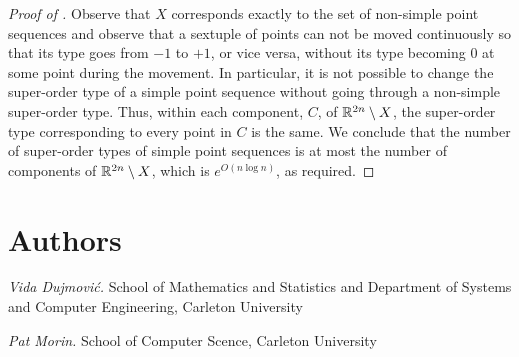 \documentclass{patmorin}
\begin{document}
\begin{proof}[Proof of ]
   Observe that $X$ corresponds exactly to the set of non-simple
   point sequences and observe that a sextuple of points can not be moved
   continuously so that its type goes from $-1$ to $+1$, or vice versa,
   without its type becoming $0$ at some point during the movement.
   In particular, it is not possible to change the super-order type of
   a simple point sequence without going through a non-simple super-order type.
   Thus, within each component, $C$, of $\mathbb{R}^{2n}\setminus X$, the
   super-order type corresponding to every point in $C$ is the same.
   We conclude that the number of super-order types of simple point
   sequences is at most the number of components of $\mathbb{R}^{2n}\setminus X$,
   which is $e^{O(n\log n)}$, as required.
\end{proof}

\section*{Authors}


\noindent\emph{Vida Dujmovi\'c.}
School of Mathematics and Statistics and Department of Systems and Computer Engineering, Carleton University

\noindent\emph{Pat Morin.}
School of Computer Scence, Carleton University
\end{document}
